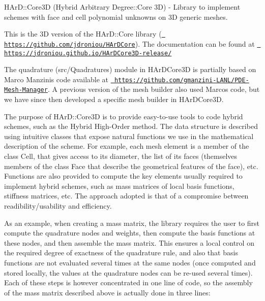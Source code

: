 H\+Ar\+D\+::\+Core3D (Hybrid Arbitrary Degree\+::\+Core 3D) -\/ Library to implement schemes with face and cell polynomial unknowns on 3D generic meshes.

This is the 3D version of the H\+Ar\+D\+::\+Core library (\href{https://github.com/jdroniou/HArDCore}{\texttt{ https\+://github.\+com/jdroniou/\+H\+Ar\+D\+Core}}). The documentation can be found at \href{https://jdroniou.github.io/HArDCore3D-release/}{\texttt{ https\+://jdroniou.\+github.\+io/\+H\+Ar\+D\+Core3\+D-\/release/}}

The quadrature (src/\+Quadratures) module in H\+Ar\+D\+Core3D is partially based on Marco Manzini\textquotesingle{}s code available at \href{https://github.com/gmanzini-LANL/PDE-Mesh-Manager}{\texttt{ https\+://github.\+com/gmanzini-\/\+L\+A\+N\+L/\+P\+D\+E-\/\+Mesh-\/\+Manager}}. A previous version of the mesh builder also used Marco\textquotesingle{}s code, but we have since then developed a specific mesh builder in H\+Ar\+D\+Core3D.

The purpose of H\+Ar\+D\+::\+Core3D is to provide easy-\/to-\/use tools to code hybrid schemes, such as the Hybrid High-\/\+Order method. The data structure is described using intuitive classes that expose natural functions we use in the mathematical description of the scheme. For example, each mesh element is a member of the class \textquotesingle{}Cell\textquotesingle{}, that gives access to its diameter, the list of its faces (themselves members of the class \textquotesingle{}Face\textquotesingle{} that describe the geometrical features of the face), etc. Functions are also provided to compute the key elements usually required to implement hybrid schemes, such as mass matrices of local basis functions, stiffness matrices, etc. The approach adopted is that of a compromise between readibility/usability and efficiency.

As an example, when creating a mass matrix, the library requires the user to first compute the quadrature nodes and weights, then compute the basis functions at these nodes, and then assemble the mass matrix. This ensures a local control on the required degree of exactness of the quadrature rule, and also that basis functions are not evaluated several times at the same nodes (once computed and stored locally, the values at the quadrature nodes can be re-\/used several times). Each of these steps is however concentrated in one line of code, so the assembly of the mass matrix described above is actually done in three lines\+:


\begin{DoxyCode}{0}
\end{DoxyCode}


